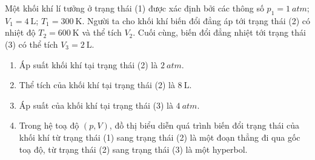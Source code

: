 \begin{ex}
	Một khối khí lí tưởng ở trạng thái (1) được xác định bởi các thông số $p_1=\SI{1}{atm}$; $V_1=\SI{4}{\liter}$; $T_1=\SI{300}{\kelvin}$. Người ta cho khối khí biến đổi đẳng áp tới trạng thái (2) có nhiệt độ $T_2=\SI{600}{\kelvin}$ và thể tích $V_2$. Cuối cùng, biến đổi đẳng nhiệt tới trạng thái (3) có thể tích $V_3=\SI{2}{\liter}$.
	\begin{enumerate}[label=\alph*)]
		\item Áp suất khối khí tại trạng thái (2) là $\SI{2}{atm}$.
		\item Thể tích của khối khí tại trạng thái (2) là $\SI{8}{\liter}$.
		\item Áp suất của khối khí tại trạng thái (3) là $\SI{4}{atm}$.
		\item Trong hệ toạ độ $(p, V)$, đồ thị biểu diễn quá trình biến đổi trạng thái của khối khí từ trạng thái (1) sang trạng thái (2) là một đoạn thẳng đi qua gốc toạ độ, từ trạng thái (2) sang trạng thái (3) là một hyperbol.
	\end{enumerate} 
	
\end{ex}
